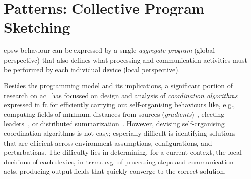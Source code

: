 


\sloppypar

\chapter[Patterns: Collective Program Sketching]{Patterns: Collective Program Sketching}\label{chap:learning:sketching}%
\minitoc%

\ac{cpsw} behaviour
 can be expressed by a single \emph{aggregate program} (global perspective)
 that also defines 
 what processing and communication activities
 must be performed by each individual device (local perspective).

Besides the programming model and its implications,
 a significant portion of research on \ac{ac}~\cite{DBLP:journals/jlap/ViroliBDACP19} has focussed
 on design and analysis of \emph{coordination algorithms} expressed in \ac{fc}
 for efficiently carrying out self-organising behaviours
 like, e.g., computing fields of minimum distances from sources (\emph{gradients})~\cite{DBLP:conf/ipsn/NagpalSB03,DBLP:journals/pervasive/MameiZL04,DBLP:conf/saso/AudritoCDV17},
 electing leaders~\cite{DBLP:conf/saso/MoBD18},
 or %
 distributed summarization~\cite{DBLP:journals/cee/AudritoCDPV21}.
%
However, devising self-organising coordination algorithms is not easy; especially difficult is identifying solutions
 that are efficient across environment assumptions, configurations, and perturbations.
%
The difficulty lies in determining, 
 for a current context,
 the local decisions of each device, 
 in terms e.g. of processing steps and communication acts,
 producing output fields that quickly converge to the correct solution.

